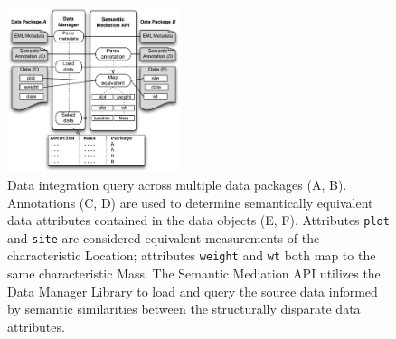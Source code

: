 \begin{figure}
\centering
\includegraphics[width=0.45\textwidth]{images/integration.pdf}
\caption{Data integration query across multiple data packages (A, B).
  Annotations (C, D) are used to determine semantically equivalent
  data attributes contained in the data objects (E, F). Attributes
  {\tt plot} and {\tt site} are considered equivalent measurements of the
  characteristic Location; attributes {\tt weight} and {\tt wt} both map to
  the same characteristic Mass. The Semantic Mediation API utilizes
  the Data Manager Library to load and query the source data informed
  by semantic similarities between the structurally disparate data
  attributes.}
\label{fig:integration}
\end{figure}

